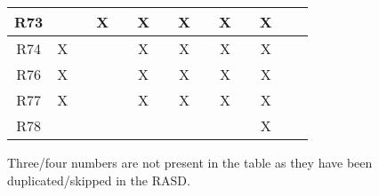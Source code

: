 \begin{table}[H]
\begin{tabular}{|c|c|c|c|c|c|c|c|c|c|c|c|c|c|}
\hline
{\cellcolor[rgb]{0.71,0.102,0}}R73 &    &    & X  &    & X  &    & X  &    & X  &      & X   &      \\ 
\hline
{\cellcolor[rgb]{0.71,0.102,0}}R74 & X  &    &    &    & X  &    & X  &    & X  &      & X   &      \\ 
\hline
{\cellcolor[rgb]{0.71,0.102,0}}R76 & X  &    &    &    & X  &    & X  &    & X  &      & X   &      \\ 
\hline
{\cellcolor[rgb]{0.71,0.102,0}}R77 & X  &    &    &    & X  &    & X  &    & X  &      & X   &      \\ 
\hline
{\cellcolor[rgb]{0.71,0.102,0}}R78 &    &    &    &    &    &    &    &    &    &      & X   &      \\
\hline
\end{tabular}
\end{table}
{\small Three/four numbers are not present in the table as they have been duplicated/skipped in the RASD.}
